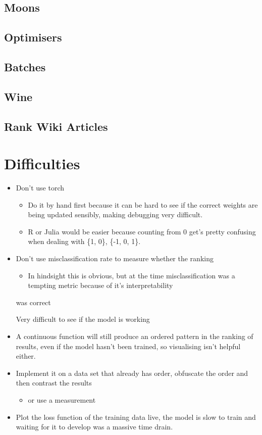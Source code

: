 \documentclass[a4paper,11pt,twoside]{article}
\begin{document}
\subsection{Moons}
\label{sec:orge799c1f}
\subsection{Optimisers}
\label{sec:org15fb41a}
\subsection{Batches}
\label{sec:org95c2135}
\subsection{Wine}
\label{sec:org4bfe1de}
\subsection{Rank Wiki Articles}
\label{sec:orgefd20e9}
\section{Difficulties}
\label{sec:org6b778a2}
\begin{itemize}
\item Don't use torch
\begin{itemize}
\item Do it by hand first because it can be hard to see if the correct
weights are being updated sensibly, making debugging very difficult.
\item R or Julia would be easier because counting from 0 get's pretty
confusing when dealing with \{1, 0\}, \{-1, 0, 1\}.
\end{itemize}
\item Don't use misclassification rate to measure whether the ranking
\begin{itemize}
\item In hindsight this is obvious, but at the time misclassification
was a tempting metric because of it's interpretability
\end{itemize}
was correct

Very difficult to see if the model is working

\item A continuous function will still produce an ordered pattern in
the ranking of results, even if the model hasn't been trained,
so visualising isn't helpful either.

\item Implement it on a data set that already has order, obfuscate the
order and then contrast the results
\begin{itemize}
\item or use a measurement
\end{itemize}

\item Plot the loss function of the training data live, the model is
slow to train and waiting for it to develop was a massive time
drain.
\end{itemize}
\end{document}
